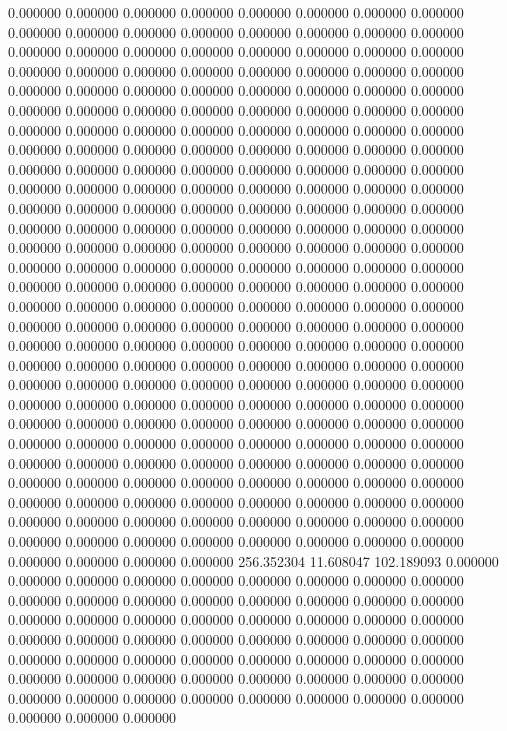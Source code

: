 0.000000 0.000000 0.000000
0.000000 0.000000 0.000000
0.000000 0.000000 0.000000
0.000000 0.000000 0.000000
0.000000 0.000000 0.000000
0.000000 0.000000 0.000000
0.000000 0.000000 0.000000
0.000000 0.000000 0.000000
0.000000 0.000000 0.000000
0.000000 0.000000 0.000000
0.000000 0.000000 0.000000
0.000000 0.000000 0.000000
0.000000 0.000000 0.000000
0.000000 0.000000 0.000000
0.000000 0.000000 0.000000
0.000000 0.000000 0.000000
0.000000 0.000000 0.000000
0.000000 0.000000 0.000000
0.000000 0.000000 0.000000
0.000000 0.000000 0.000000
0.000000 0.000000 0.000000
0.000000 0.000000 0.000000
0.000000 0.000000 0.000000
0.000000 0.000000 0.000000
0.000000 0.000000 0.000000
0.000000 0.000000 0.000000
0.000000 0.000000 0.000000
0.000000 0.000000 0.000000
0.000000 0.000000 0.000000
0.000000 0.000000 0.000000
0.000000 0.000000 0.000000
0.000000 0.000000 0.000000
0.000000 0.000000 0.000000
0.000000 0.000000 0.000000
0.000000 0.000000 0.000000
0.000000 0.000000 0.000000
0.000000 0.000000 0.000000
0.000000 0.000000 0.000000
0.000000 0.000000 0.000000
0.000000 0.000000 0.000000
0.000000 0.000000 0.000000
0.000000 0.000000 0.000000
0.000000 0.000000 0.000000
0.000000 0.000000 0.000000
0.000000 0.000000 0.000000
0.000000 0.000000 0.000000
0.000000 0.000000 0.000000
0.000000 0.000000 0.000000
0.000000 0.000000 0.000000
0.000000 0.000000 0.000000
0.000000 0.000000 0.000000
0.000000 0.000000 0.000000
0.000000 0.000000 0.000000
0.000000 0.000000 0.000000
0.000000 0.000000 0.000000
0.000000 0.000000 0.000000
0.000000 0.000000 0.000000
0.000000 0.000000 0.000000
0.000000 0.000000 0.000000
0.000000 0.000000 0.000000
0.000000 0.000000 0.000000
0.000000 0.000000 0.000000
0.000000 0.000000 0.000000
0.000000 0.000000 0.000000
0.000000 0.000000 0.000000
0.000000 0.000000 0.000000
0.000000 0.000000 0.000000
0.000000 0.000000 0.000000
0.000000 0.000000 0.000000
0.000000 0.000000 0.000000
0.000000 0.000000 0.000000
0.000000 0.000000 0.000000
0.000000 0.000000 0.000000
0.000000 0.000000 0.000000
0.000000 0.000000 0.000000
0.000000 0.000000 0.000000
256.352304 11.608047 102.189093
0.000000 0.000000 0.000000
0.000000 0.000000 0.000000
0.000000 0.000000 0.000000
0.000000 0.000000 0.000000
0.000000 0.000000 0.000000
0.000000 0.000000 0.000000
0.000000 0.000000 0.000000
0.000000 0.000000 0.000000
0.000000 0.000000 0.000000
0.000000 0.000000 0.000000
0.000000 0.000000 0.000000
0.000000 0.000000 0.000000
0.000000 0.000000 0.000000
0.000000 0.000000 0.000000
0.000000 0.000000 0.000000
0.000000 0.000000 0.000000
0.000000 0.000000 0.000000
0.000000 0.000000 0.000000
0.000000 0.000000 0.000000
0.000000 0.000000 0.000000
